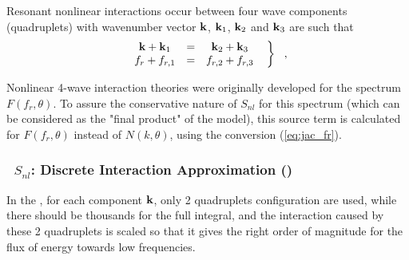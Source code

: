 
\noindent


Resonant nonlinear interactions occur between four wave components
(quadruplets) with wavenumber vector $\mbox{\bf k}$, $\mbox{\bf k}_1$, $\mbox{\bf k}_2$ and $\mbox{\bf k}_3$ are such that 
\begin{equation} \left .
\begin{array}{ccc}
  \mbox{\bf k} + \mbox{\bf k}_1 & = & \mbox{\bf k}_2 + \mbox{\bf k}_3     \\
  f_r + f_{r,1}& =& f_{r,2} +  f_{r,3} 
\end{array} \:\:\: \right \rbrace \:\:\: , \label{eq:resonance}
\end{equation}

Nonlinear 4-wave interaction theories were 
originally developed for the spectrum $F(f_r ,\theta)$. To assure the
conservative nature of $S_{nl}$ for this spectrum (which can be considered as
the "final product" of the model), this source term is calculated for
$F(f_r,\theta)$ instead of $N(k,\theta)$, using the conversion
(\ref{eq:jac_fr}).

\vsssub
\subsubsection{~$S_{nl}$: Discrete Interaction Approximation (\dia)} \label{sec:NL1}
\vsssub




 In the \dia, for each component $\mbox{\bf k}$, only 2 quadruplets configuration are 
used, while there should be thousands for the full integral, and the interaction caused by these 2 quadruplets 
is scaled so that it gives the right order of magnitude for the flux of energy towards low frequencies. 

